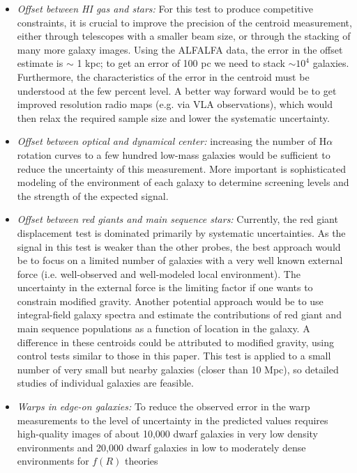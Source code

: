 \documentclass{emulateapj}
\newcommand{\ha}{H$\alpha$}
\begin{document}
\begin{itemize}
\item {\it Offset between HI gas and stars:}
  For this test to produce competitive constraints, it is crucial to improve
  the precision of the centroid measurement, either through telescopes with
  a smaller beam size, or through the stacking of many more galaxy images.
  Using the ALFALFA data, the error in the offset estimate is $\sim$ 1 kpc;
  to get an error of 100 pc we need to stack $\sim 10^{4}$
  galaxies.  Furthermore, the characteristics of the error
  in the centroid must be understood at the few percent level. A better way forward
  would be to get improved resolution radio maps (e.g. via VLA observations), 
  which would then relax
  the required sample size and lower the systematic uncertainty. 
\item {\it Offset between optical and dynamical center:}
  increasing the number of \ha~ rotation curves to a few hundred 
  low-mass galaxies would be sufficient to reduce the uncertainty of
  this measurement.  More important is sophisticated
  modeling of the environment of each galaxy to determine screening levels and
  the strength of the expected signal.
\item {\it Offset between red giants and main sequence stars:}
  Currently, the red giant displacement test is dominated primarily by
  systematic uncertainties. As the signal in this test is weaker than the
  other probes, the best approach would be to focus on a limited number
  of galaxies with a very well known external force (i.e. well-observed and
  well-modeled local environment). The uncertainty in the external force is the
  limiting factor if one wants to constrain modified gravity.  Another potential
  approach would be to use integral-field galaxy spectra and estimate the
  contributions of red giant and main sequence populations as a function of
  location in the galaxy.  A difference in these centroids could be
  attributed to modified gravity, using control tests similar to those in
  this paper.  This test is applied to a small number of 
  very small but nearby galaxies (closer than 10 Mpc), so detailed studies of individual 
  galaxies are feasible. 
\item {\it Warps in edge-on galaxies:}
  To reduce the observed error in the warp measurements 
  to the level of uncertainty in the 
  predicted values requires high-quality images
  of about 10,000 dwarf galaxies in very low density environments and 20,000
  dwarf galaxies in low to moderately dense environments for $f(R)$ theories

\end{itemize}
\end{document}
